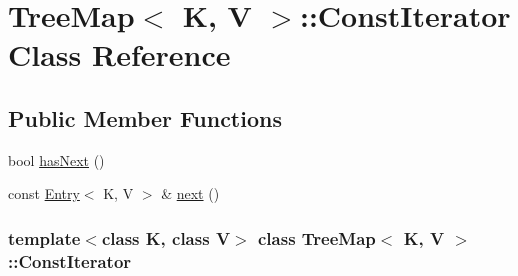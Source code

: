 \hypertarget{class_tree_map_1_1_const_iterator}{
\section{TreeMap$<$ K, V $>$::ConstIterator Class Reference}
\label{class_tree_map_1_1_const_iterator}
}
\subsection*{Public Member Functions}
\begin{DoxyCompactItemize}
\item 
bool \hyperlink{class_tree_map_1_1_const_iterator_a17022a5778653183df86ff7ea2bb262e}{hasNext} ()
\item 
const \hyperlink{class_entry}{Entry}$<$ K, V $>$ \& \hyperlink{class_tree_map_1_1_const_iterator_a1e0e0e9831686fa636dc2e24babc037b}{next} ()
\end{DoxyCompactItemize}
\subsubsection*{template$<$class K, class V$>$ class TreeMap$<$ K, V $>$::ConstIterator}




